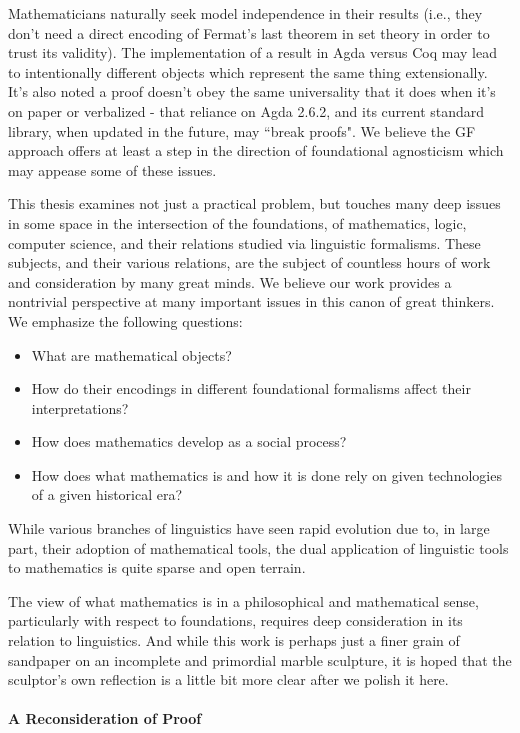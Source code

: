 Mathematicians naturally seek model independence in their results (i.e., they
don't need a direct encoding of Fermat's last theorem in set theory in order to
trust its validity). The implementation of a result in Agda versus Coq may lead
to intentionally different objects which represent the same thing extensionally.
It's also noted a proof doesn't obey the same universality that it does when
it's on paper or verbalized - that reliance on Agda 2.6.2, and its current standard
library, when updated in the future, may ``break proofs".
We believe the GF approach offers at least a step in the direction of
foundational agnosticism which may appease some of these issues.

This thesis examines not just a practical problem, but touches many deep issues
in some space in the intersection of the foundations, of mathematics, logic,
computer science, and their relations studied via linguistic formalisms. These
subjects, and their various relations, are the subject of countless hours of
work and consideration by many great minds. We believe our work provides a
nontrivial perspective at many important issues in this canon of great thinkers.
We emphasize the following questions:

\begin{itemize}[noitemsep]
\item What are mathematical objects?
\item How do their encodings in different foundational formalisms affect their
  interpretations?
\item How does mathematics develop as a social process?
\item How does what mathematics is and how it is done rely on given technologies
  of a given historical era?
\end{itemize}

While various branches of linguistics have seen rapid evolution due to, in large
part, their adoption of mathematical tools, the dual application of linguistic
tools to mathematics is quite sparse and open terrain.

The view of what mathematics is in a philosophical and mathematical sense,
particularly with respect to foundations, requires deep consideration in its
relation to linguistics. And while this work is perhaps just a finer grain of
sandpaper on an incomplete and primordial marble sculpture, it is hoped that the
sculptor's own reflection is a little bit more clear after we polish it here.

\paragraph{A Reconsideration of Proof}

